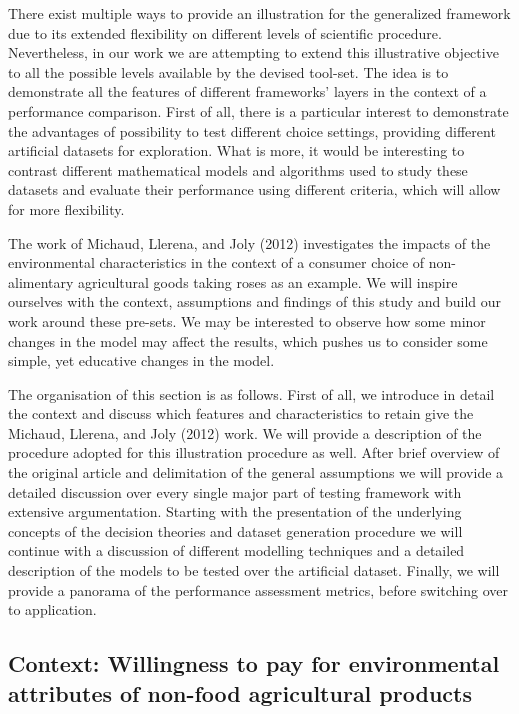 \documentclass[12pt,]{article}
\begin{document}
There exist multiple ways to provide an illustration for the generalized
framework due to its extended flexibility on different levels of
scientific procedure. Nevertheless, in our work we are attempting to
extend this illustrative objective to all the possible levels available
by the devised tool-set. The idea is to demonstrate all the features of
different frameworks' layers in the context of a performance comparison.
First of all, there is a particular interest to demonstrate the
advantages of possibility to test different choice settings, providing
different artificial datasets for exploration. What is more, it would be
interesting to contrast different mathematical models and algorithms
used to study these datasets and evaluate their performance using
different criteria, which will allow for more flexibility.

The work of Michaud, Llerena, and Joly (2012) investigates the impacts
of the environmental characteristics in the context of a consumer choice
of non-alimentary agricultural goods taking roses as an example. We will
inspire ourselves with the context, assumptions and findings of this
study and build our work around these pre-sets. We may be interested to
observe how some minor changes in the model may affect the results,
which pushes us to consider some simple, yet educative changes in the
model.

The organisation of this section is as follows. First of all, we
introduce in detail the context and discuss which features and
characteristics to retain give the Michaud, Llerena, and Joly (2012)
work. We will provide a description of the procedure adopted for this
illustration procedure as well. After brief overview of the original
article and delimitation of the general assumptions we will provide a
detailed discussion over every single major part of testing framework
with extensive argumentation. Starting with the presentation of the
underlying concepts of the decision theories and dataset generation
procedure we will continue with a discussion of different modelling
techniques and a detailed description of the models to be tested over
the artificial dataset. Finally, we will provide a panorama of the
performance assessment metrics, before switching over to application.

\hypertarget{context-willingness-to-pay-for-environmental-attributes-of-non-food-agricultural-products}{%
\subsection{Context: Willingness to pay for environmental attributes of
non-food agricultural
products}\label{context-willingness-to-pay-for-environmental-attributes-of-non-food-agricultural-products}}
\end{document}
